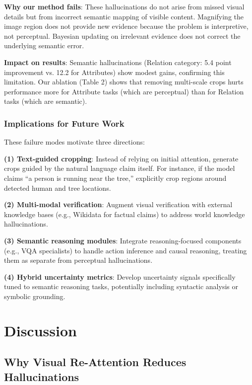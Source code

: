 \documentclass[12pt]{article}
\begin{document}
\textbf{Why our method fails}: These hallucinations do not arise from missed visual 
details but from incorrect semantic mapping of visible content. Magnifying the 
image region does not provide new evidence because the problem is interpretive, 
not perceptual. Bayesian updating on irrelevant evidence does not correct the 
underlying semantic error.

\textbf{Impact on results}: Semantic hallucinations (Relation category: 5.4 point 
improvement vs. 12.2 for Attributes) show modest gains, confirming this limitation. 
Our ablation (Table 2) shows that removing multi-scale crops hurts performance 
more for Attribute tasks (which are perceptual) than for Relation tasks (which are 
semantic).

\subsubsection{Implications for Future Work}

These failure modes motivate three directions:

\textbf{(1) Text-guided cropping}: Instead of relying on initial attention, generate 
crops guided by the natural language claim itself. For instance, if the model claims 
``a person is running near the tree,'' explicitly crop regions around detected 
human and tree locations.

\textbf{(2) Multi-modal verification}: Augment visual verification with external 
knowledge bases (e.g., Wikidata for factual claims) to address world knowledge 
hallucinations.

\textbf{(3) Semantic reasoning modules}: Integrate reasoning-focused components 
(e.g., VQA specialists) to handle action inference and causal reasoning, treating 
them as separate from perceptual hallucinations.

\textbf{(4) Hybrid uncertainty metrics}: Develop uncertainty signals specifically 
tuned to semantic reasoning tasks, potentially including syntactic analysis or 
symbolic grounding.


\section{Discussion}

\subsection{Why Visual Re-Attention Reduces Hallucinations}
\end{document}
